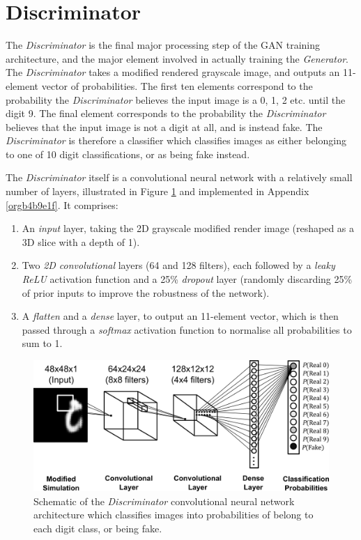 \documentclass[a4paper,11pt,openany]{book}
\begin{document}
\section*{Discriminator}
\label{sec:org0277fb9}

The \emph{Discriminator} is the final major processing step of the GAN training architecture, and the major element involved in actually training the \emph{Generator}.
The \emph{Discriminator} takes a modified rendered grayscale image, and outputs an 11-element vector of probabilities.
The first ten elements correspond to the probability the \emph{Discriminator} believes the input image is a 0, 1, 2 etc. until the digit 9.
The final element corresponds to the probability the \emph{Discriminator} believes that the input image is not a digit at all, and is instead fake.
The \emph{Discriminator} is therefore a classifier which classifies images as either belonging to one of 10 digit classifications, or as being fake instead.

The \emph{Discriminator} itself is a convolutional neural network with a relatively small number of layers, illustrated in Figure \ref{orgb957cd2} and implemented in Appendix \ref{orgb4b9e1f}. It comprises:
\begin{enumerate}
\item An \emph{input} layer, taking the 2D grayscale modified render image (reshaped as a 3D slice with a depth of 1).
\item Two \emph{2D convolutional} layers (64 and 128 filters), each followed by a \emph{leaky ReLU} activation function and a 25\% \emph{dropout} layer (randomly discarding 25\% of prior inputs to improve the robustness of the network).
\item A \emph{flatten} and a \emph{dense} layer, to output an 11-element vector, which is then passed through a \emph{softmax} activation function to normalise all probabilities to sum to 1.
\end{enumerate}

\begin{figure}
\begin{center}
\includegraphics[width=.9\linewidth]{./images/methods_discriminator.png}
\end{center}
\caption[Schematic of \emph{Discriminator} architecture]{\label{orgb957cd2}
Schematic of the \emph{Discriminator} convolutional neural network architecture which classifies images into probabilities of belong to each digit class, or being fake.}
\end{figure}
\end{document}
